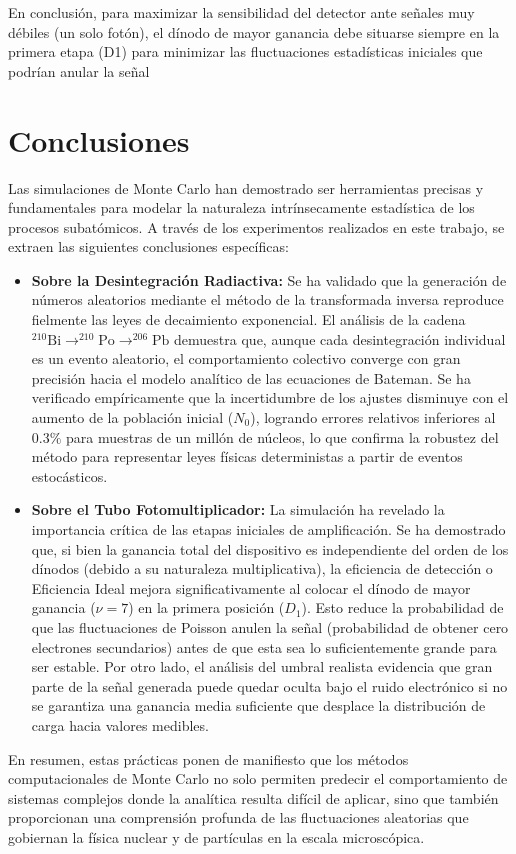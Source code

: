 \documentclass[11pt,a4paper]{article}
\begin{document}
En conclusión, para maximizar la sensibilidad del detector ante señales muy débiles (un solo fotón), el dínodo de mayor ganancia debe situarse siempre en la primera etapa (D1) para minimizar las fluctuaciones estadísticas iniciales que podrían anular la señal

\section{Conclusiones}

Las simulaciones de Monte Carlo han demostrado ser herramientas precisas y fundamentales para modelar la naturaleza intrínsecamente estadística de los procesos subatómicos. A través de los experimentos realizados en este trabajo, se extraen las siguientes conclusiones específicas:

\begin{itemize}
    \item \textbf{Sobre la Desintegración Radiactiva:} Se ha validado que la generación de números aleatorios mediante el método de la transformada inversa reproduce fielmente las leyes de decaimiento exponencial. El análisis de la cadena $^{210}\text{Bi} \to ^{210}\text{Po} \to ^{206}\text{Pb}$ demuestra que, aunque cada desintegración individual es un evento aleatorio, el comportamiento colectivo converge con gran precisión hacia el modelo analítico de las ecuaciones de Bateman. Se ha verificado empíricamente que la incertidumbre de los ajustes disminuye con el aumento de la población inicial ($N_0$), logrando errores relativos inferiores al $0.3\%$ para muestras de un millón de núcleos, lo que confirma la robustez del método para representar leyes físicas deterministas a partir de eventos estocásticos.
    
    \item \textbf{Sobre el Tubo Fotomultiplicador:} La simulación ha revelado la importancia crítica de las etapas iniciales de amplificación. Se ha demostrado que, si bien la ganancia total del dispositivo es independiente del orden de los dínodos (debido a su naturaleza multiplicativa), la eficiencia de detección o Eficiencia Ideal mejora significativamente al colocar el dínodo de mayor ganancia ($\nu=7$) en la primera posición ($D_1$). Esto reduce la probabilidad de que las fluctuaciones de Poisson anulen la señal (probabilidad de obtener cero electrones secundarios) antes de que esta sea lo suficientemente grande para ser estable. Por otro lado, el análisis del umbral realista evidencia que gran parte de la señal generada puede quedar oculta bajo el ruido electrónico si no se garantiza una ganancia media suficiente que desplace la distribución de carga hacia valores medibles.
\end{itemize}

En resumen, estas prácticas ponen de manifiesto que los métodos computacionales de Monte Carlo no solo permiten predecir el comportamiento de sistemas complejos donde la analítica resulta difícil de aplicar, sino que también proporcionan una comprensión profunda de las fluctuaciones aleatorias que gobiernan la física nuclear y de partículas en la escala microscópica.
\end{document}
